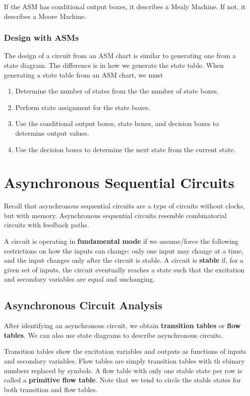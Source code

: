 \documentclass[12pt]{article}
\begin{document}
If the ASM has conditional output boxes, it describes a Mealy Machine. If not, it describes a Moore Machine.

\subsubsection*{Design with ASMs}
The design of a circuit from an ASM chart is similar to generating one from a state diagram. The difference is in how we generate the state table. When generating a state table from an ASM chart, we must
\begin{enumerate}
\item Determine the number of states from the the number of state boxes.
\item Perform state assignment for the state boxes.
\item Use the conditional output boxes, state boxes, and decision boxes to determine output values.
\item Use the decision boxes to determine the next state from the current state.
\end{enumerate}

\section*{Asynchronous Sequential Circuits}
Recall that asynchronous sequential circuits are a type of circuits without clocks, but with memory. Asynchronous sequential circuits resemble combinatorial circuits with feedback paths.

A circuit is operating in {\bf fundamental mode} if we assume/force the following restrictions on how the inputs can change: only one input may change at a time, and the input changes only after the circuit is stable. A circuit is {\bf stable} if, for a given set of inputs, the circuit eventually reaches a state such that the excitation and secondary variables are equal and unchanging.

\subsection*{Asynchronous Circuit Analysis}
After identifying an asynchronous circuit, we obtain {\bf transition tables} or {\bf flow tables}. We can also use state diagrams to describe asynchronous circuits.

Transition tables show the excitation variables and outputs as functions of inputs and secondary variables. Flow tables are simply transition tables with th ebinary numbers replaced by symbols. A flow table with only one stable state per row is called a {\bf primitive flow table}. Note that we tend to circle the stable states for both transition and flow tables.
\end{document}
